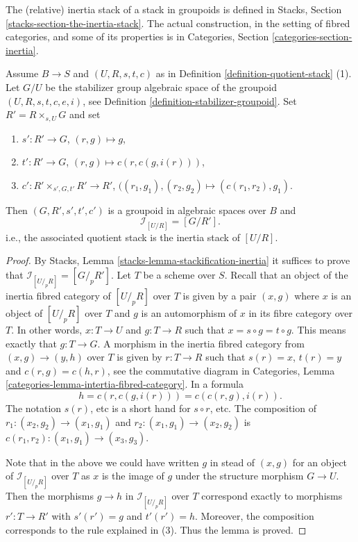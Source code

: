 \noindent
The (relative) inertia stack of a stack in groupoids is defined in
Stacks, Section \ref{stacks-section-the-inertia-stack}.
The actual construction, in the setting of fibred categories, and some
of its properties is in
Categories, Section \ref{categories-section-inertia}.

\begin{lemma}
\label{lemma-presentation-inertia}
Assume $B \to S$ and $(U, R, s, t, c)$ as in
Definition \ref{definition-quotient-stack} (1).
Let $G/U$ be the stabilizer group algebraic space of the groupoid
$(U, R, s, t, c, e, i)$, see
Definition \ref{definition-stabilizer-groupoid}.
Set $R' = R \times_{s, U} G$ and set
\begin{enumerate}
\item $s' : R' \to G$, $(r, g) \mapsto g$,
\item $t' : R' \to G$, $(r, g) \mapsto c(r, c(g, i(r)))$,
\item $c' : R' \times_{s', G, t'} R' \to R'$,
$((r_1, g_1), (r_2, g_2) \mapsto (c(r_1, r_2), g_1)$.
\end{enumerate}
Then $(G, R', s', t', c')$ is a groupoid in algebraic spaces over $B$
and
$$
\mathcal{I}_{[U/R]} = [G/ R'].
$$
i.e., the associated quotient stack is the inertia stack of $[U/R]$.
\end{lemma}

\begin{proof}
By
Stacks, Lemma \ref{stacks-lemma-stackification-inertia}
it suffices to prove that $\mathcal{I}_{[U/_{\!p}R]} = [G/_{\!p} R']$.
Let $T$ be a scheme over $S$. Recall that an object of the inertia fibred
category of $[U/_{\!p}R]$ over $T$ is given by a pair
$(x, g)$ where $x$ is an object of $[U/_{\!\!p}R]$ over $T$
and $g$ is an automorphism of $x$ in its fibre category over $T$.
In other words, $x : T \to U$ and $g : T \to R$ such that
$x = s \circ g = t \circ g$. This means exactly that
$g : T \to G$. A morphism in the inertia fibred category
from $(x, g) \to (y, h)$ over $T$ is given by
$r : T \to R$ such that $s(r) = x$, $t(r) = y$
and $c(r, g) = c(h, r)$, see the commutative diagram in
Categories, Lemma \ref{categories-lemma-intertia-fibred-category}.
In a formula
$$
h = c(r, c(g, i(r))) = c(c(r, g), i(r)).
$$
The notation $s(r)$, etc is a short hand for $s \circ r$, etc.
The composition of $r_1 : (x_2, g_2) \to (x_1, g_1)$
and $r_2 : (x_1, g_1) \to (x_2, g_2)$ is
$c(r_1, r_2) : (x_1, g_1) \to (x_3, g_3)$.

\medskip\noindent
Note that in the above we could have written $g$ in stead of $(x, g)$
for an object of $\mathcal{I}_{[U/_{\!p}R]}$ over $T$ as $x$ is the
image of $g$ under the structure morphism $G \to U$. Then the morphisms
$g \to h$ in $\mathcal{I}_{[U/_{\!p}R]}$ over $T$ correspond exactly
to morphisms $r' : T \to R'$ with $s'(r') = g$ and $t'(r') = h$.
Moreover, the composition corresponds to the rule explained in (3).
Thus the lemma is proved.
\end{proof}

